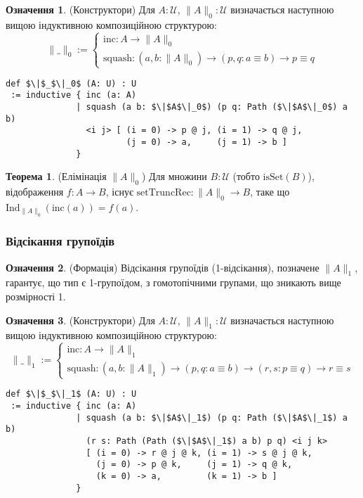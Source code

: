 \documentclass{article}
\theoremstyle{definition}
\newtheorem{theorem}{Теорема}
\newtheorem{definition}{Означення}
\begin{document}
\begin{definition} (Конструктори)
Для \( A : \mathcal{U} \), \( \| A \|_0 : \mathcal{U} \) визначається наступною вищою
індуктивною композиційною структурою:
\[
\| \_ \|_0 :=
\begin{cases}
\text{inc} : A \to \| A \|_0 \\
\text{squash} : (a, b : \| A \|_0) \to (p, q : a \equiv b) \to p \equiv q
\end{cases}
\]
\begin{lstlisting}[mathescape=true]
def $\|$_$\|_0$ (A: U) : U
 := inductive { inc (a: A)
              | squash (a b: $\|$A$\|_0$) (p q: Path ($\|$A$\|_0$) a b)
                <i j> [ (i = 0) -> p @ j, (i = 1) -> q @ j,
                        (j = 0) -> a,     (j = 1) -> b ]
              }
\end{lstlisting}
\end{definition}

\begin{theorem} (Елімінація \( \| A \|_0 \))
Для множини \( B : \mathcal{U} \) (тобто \( \text{isSet}(B) \)), відображення \( f : A \to B \),
існує \( \text{setTruncRec} : \| A \|_0 \to B \), таке що \( \text{Ind}_{\|A\|_0}(\text{inc}(a)) = f(a) \).
\end{theorem}

\subsubsection*{Відсікання групоїдів}
\begin{definition} (Формація)
Відсікання групоїдів (1-відсікання), позначене \( \| A \|_1 \), гарантує, що
тип є 1-групоїдом, з гомотопічними групами, що зникають вище розмірності 1.
\end{definition}

\begin{definition} (Конструктори)
Для \( A : \mathcal{U} \), \( \| A \|_1 : \mathcal{U} \) визначається наступною вищою
індуктивною композиційною структурою:
\[
\| \_ \|_1 :=
\begin{cases}
\text{inc} : A \to \| A \|_1 \\
\text{squash} : (a, b : \| A \|_1) \to (p, q : a \equiv b) \to (r, s : p \equiv q) \to r \equiv s
\end{cases}
\]
\begin{lstlisting}[mathescape=true]
def $\|$_$\|_1$ (A: U) : U
 := inductive { inc (a: A)
              | squash (a b: $\|$A$\|_1$) (p q: Path ($\|$A$\|_1$) a b)
                (r s: Path (Path ($\|$A$\|_1$) a b) p q) <i j k>
                [ (i = 0) -> r @ j @ k, (i = 1) -> s @ j @ k,
                  (j = 0) -> p @ k,     (j = 1) -> q @ k,
                  (k = 0) -> a,         (k = 1) -> b ]
              }
\end{lstlisting}
\end{definition}
\end{document}
